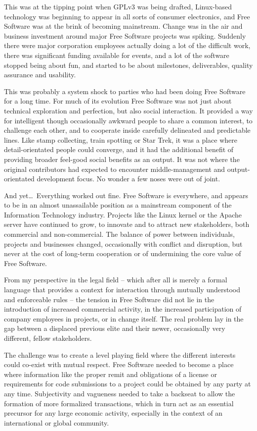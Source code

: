 This was at the tipping point when GPLv3 was being drafted, Linux-based
technology was beginning to appear in all sorts of consumer electronics, and
Free Software was at the brink of becoming mainstream. Change was in the air and
business investment around major Free Software projects was spiking. Suddenly
there were major corporation employees actually doing a lot of the difficult
work, there was significant funding available for events, and a lot of the
software stopped being about fun, and started to be about milestones,
deliverables, quality assurance and usability.

This was probably a system shock to parties who had been doing Free Software for
a long time. For much of its evolution Free Software was not just about
technical exploration and perfection, but also social interaction. It provided a
way for intelligent though occasionally awkward people to share a common
interest, to challenge each other, and to cooperate inside carefully delineated
and predictable lines. Like stamp collecting, train spotting or Star Trek, it
was a place where detail-orientated people could converge, and it had the
additional benefit of providing broader feel-good social benefits as an output.
It was not where the original contributors had expected to encounter
middle-management and output-orientated development focus. No wonder a few noses
were out of joint.

And yet\dots\ Everything worked out fine. Free Software is everywhere, and
appears to be in an almost unassailable position as a mainstream component of
the Information Technology industry. Projects like the Linux kernel or the
Apache server have continued to grow, to innovate and to attract new
stakeholders, both commercial and non-commercial. The balance of power between
individuals, projects and businesses changed, occasionally with conflict and
disruption, but never at the cost of long-term cooperation or of undermining the
core value of Free Software.

From my perspective in the legal field -- which after all is merely a formal
language that provides a context for interaction through mutually understood and
enforceable rules -- the tension in Free Software did not lie in the
introduction of increased commercial activity, in the increased participation of
company employees in projects, or in change itself. The real problem lay in the
gap between a displaced previous elite and their newer, occasionally very
different, fellow stakeholders.

The challenge was to create a level playing field where the different interests
could co-exist with mutual respect. Free Software needed to become a place where
information like the proper remit and obligations of a license or requirements
for code submissions to a project could be obtained by any party at any time.
Subjectivity and vagueness needed to take a backseat to allow the formation of
more formalized transactions, which in turn act as an essential precursor for
any large economic activity, especially in the context of an international or
global community.

